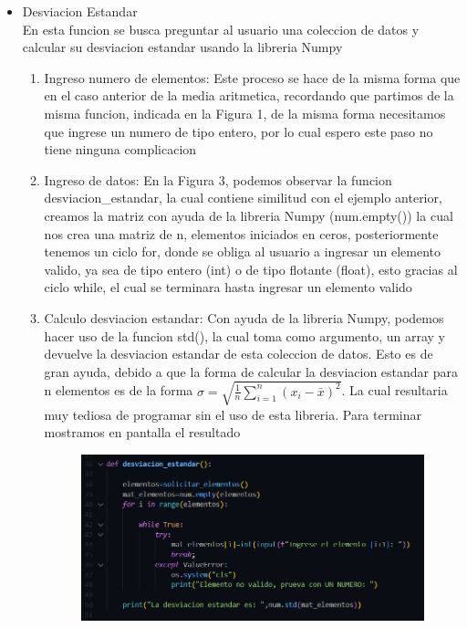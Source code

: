 \documentclass[12pt]{article}
\begin{document}
\begin{itemize}
\begin{enumerate}
\end{enumerate}

\item Desviacion Estandar\\
En esta funcion se busca preguntar al usuario una coleccion de datos y calcular su desviacion estandar usando la libreria Numpy
	\begin{enumerate}
		\item Ingreso numero de elementos: Este proceso se hace de la misma forma que en el caso anterior de la media aritmetica, recordando que partimos de la misma funcion, indicada en la Figura 1, de la misma forma necesitamos que ingrese un numero de tipo entero, por lo cual espero este paso no tiene ninguna complicacion
		\item Ingreso de datos: En la Figura 3, podemos observar la funcion desviacion\_estandar, la cual contiene similitud con el ejemplo anterior, creamos la matriz con ayuda de la libreria Numpy (num.empty()) la cual nos crea una matriz de n, elementos iniciados en ceros, posteriormente tenemos un ciclo for, donde se obliga al usuario a ingresar un elemento valido, ya sea de tipo entero (int) o de tipo flotante (float), esto gracias al ciclo while, el cual se terminara hasta ingresar un elemento valido
		\item Calculo desviacion estandar: Con ayuda de la libreria Numpy, podemos hacer uso de la funcion std(), la cual toma como argumento, un array y devuelve la desviacion estandar de esta coleccion de datos. Esto es de gran ayuda, debido a que la forma de calcular la desviacion estandar para n elementos  es de la forma $\sigma = \sqrt{\frac{1}{n} \sum_{i=1}^{n} (x_i - \bar{x})^2}
$. La cual resultaria muy tediosa de programar sin el uso de esta libreria. Para terminar mostramos en pantalla el resultado 
		\begin{figure}[H]
		\begin{center}
		\includegraphics[width=.8\textwidth]{desviacion.png}
		\end{center}
		\end{figure}


\end{enumerate}
\end{itemize}
\end{document}
